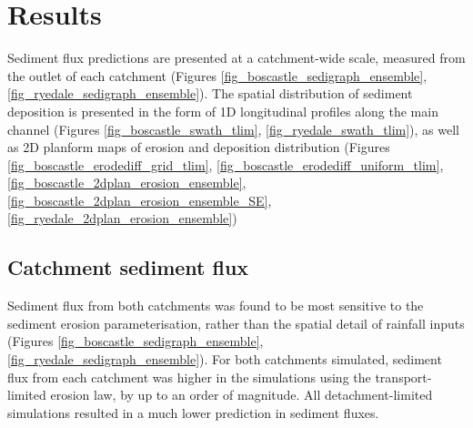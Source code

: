%
%

\section{Results}

Sediment flux predictions are presented at a catchment-wide scale, measured from the outlet of each catchment (Figures \ref{fig_boscastle_sedigraph_ensemble}, \ref{fig_ryedale_sedigraph_ensemble}). The spatial distribution of sediment deposition is presented in the form of 1D longitudinal profiles along the main channel (Figures \ref{fig_boscastle_swath_tlim}, \ref{fig_ryedale_swath_tlim}), as well as 2D planform maps of erosion and deposition distribution (Figures \ref{fig_boscastle_erodediff_grid_tlim}, \ref{fig_boscastle_erodediff_uniform_tlim}, \ref{fig_boscastle_2dplan_erosion_ensemble}, \ref{fig_boscastle_2dplan_erosion_ensemble_SE}, \ref{fig_ryedale_2dplan_erosion_ensemble})

\subsection{Catchment sediment flux}
Sediment flux from both catchments was found to be most sensitive to the sediment erosion parameterisation, rather than the spatial detail of rainfall inputs (Figures \ref{fig_boscastle_sedigraph_ensemble}, \ref{fig_ryedale_sedigraph_ensemble}). For both catchments simulated, sediment flux from each catchment was higher in the simulations using the transport-limited erosion law, by up to an order of magnitude. All detachment-limited simulations resulted in a much lower prediction in sediment fluxes.

